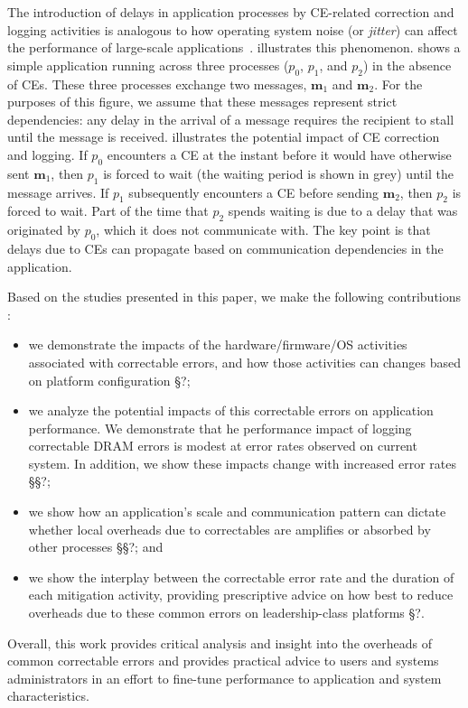 The introduction of delays in application processes by CE-related correction and 
logging activities is analogous to how operating system noise (or \emph{jitter}) can 
affect the performance of large-scale applications~\cite{Hoefler:2010:Characterizing, 
Ferreira:08:characterizing}.   illustrates this phenomenon.  
 shows a simple application running across three processes 
($p_0$, $p_1$, and $p_2$) in the absence of CEs.  These three processes exchange two 
messages, $\mathbf{m}_1$ and $\mathbf{m}_2$.  For the purposes of this figure, we assume 
that these messages represent strict dependencies: any delay in the arrival of a message requires the
recipient to stall until the message is received. 
illustrates the potential impact of CE correction and logging.  If $p_0$
encounters a CE at the instant before it would have otherwise sent $\mathbf{m}_1$,
then $p_1$ is forced to wait (the waiting period is shown in grey) until the
message arrives.  If $p_1$ subsequently encounters a CE before sending
$\mathbf{m}_2$, then $p_2$ is forced to wait.  Part of the time that $p_2$
spends waiting is due to a delay that was originated by $p_0$, which it does not
communicate with.  The key point is that delays due to CEs can propagate based on 
communication dependencies in the application.

Based on the studies presented in this paper, we make the following
contributions :

\begin{itemize}

\item we demonstrate the impacts of the hardware/firmware/OS activities
        associated with correctable errors, and how those activities can changes
        based on platform configuration \S{?};

\item we analyze the potential impacts of this correctable errors on application
        performance.  We demonstrate that he performance impact of logging
                correctable DRAM errors is modest at error rates observed on
                current system.  In addition, we show these impacts change with
                increased error rates \S\S{?};

\item we show how an application's scale and communication pattern can dictate
        whether local overheads due to correctables are amplifies or absorbed by
        other processes \S\S{?}; and

\item we show the interplay between the correctable error rate and the duration
        of each mitigation activity, providing prescriptive advice on how best
        to reduce overheads due to these common errors on leadership-class platforms
        \S{?}.

\end{itemize}

Overall, this work provides critical analysis and insight into the overheads of
common correctable errors and provides practical advice to users and systems
administrators in an effort to fine-tune performance to application and system
characteristics.
